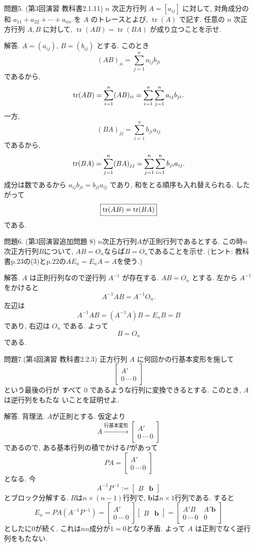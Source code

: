 \documentclass[dvipdfmx,a4paper,11pt]{article} %
\theoremstyle{definition}
\begin{document}
問題5. (第3回演習 教科書2.1.11) \(n\) 次正方行列 \(A=[a_{ij}]\) に対して, 対角成分の和
\(
a_{11}+a_{22}+\cdots+a_{nn}
\)
を \(A\) のトレースとよび, \(\operatorname{tr}(A)\) で記す. 任意の \(n\) 次正方行列 \(A,B\) に対して,
\(
\operatorname{tr}(AB)=\operatorname{tr}(BA)
\)
が成り立つことを示せ.

解答. 
$A=(a_{ij})$, $B=(b_{ij})$ とする. このとき
\[
(AB)_{ii}
=
\sum_{j=1}^{n}a_{ij}b_{ji}
\]
であるから,
\[
\tr(AB)
=
\sum_{i=1}^{n}(AB)_{ii}
=
\sum_{i=1}^{n}\sum_{j=1}^{n}a_{ij}b_{ji}.
\]
一方,
\[
(BA)_{jj}
=
\sum_{i=1}^{n}b_{ji}a_{ij}
\]
であるから,
\[
\tr(BA)
=
\sum_{j=1}^{n}(BA)_{jj}
=
\sum_{j=1}^{n}\sum_{i=1}^{n}b_{ji}a_{ij}.
\]
成分は数であるから $a_{ij}b_{ji}=b_{ji}a_{ij}$ であり, 和をとる順序も入れ替えられる. したがって
\[
\boxed{\tr(AB)=\tr(BA)}
\]
である.

問題6. (第3回演習追加問題 8) $n$次正方行列$A$が正則行列であるとする.
この時$n$次正方行列$B$について, 
$AB=O_{n}$ならば$B=O_n$であることを示せ.
(ヒント: 教科書p.23の(3)とp.22の$AE_n=E_nA=A$を使う.)

解答. 
$A$ は正則行列なので逆行列 $A^{-1}$ が存在する. $AB=O_n$ とする. 左から $A^{-1}$ をかけると
\[
A^{-1}AB=A^{-1}O_n.
\]
左辺は
\[
A^{-1}AB
=
(A^{-1}A)B
=
E_nB
=
B
\]
であり, 右辺は $O_n$ である. よって
\[
\boxed{B=O_n}
\]
である.

問題7.(第4回演習 教科書2.2.3) 正方行列 \(A\) に何回かの行基本変形を施して
\[
\begin{bmatrix}
A'\\
0 \ \cdots \ 0
\end{bmatrix}
\]
という最後の行が
すべて \(0\) であるような行列に変換できるとする. このとき, \(A\) は逆行列をもたな
いことを証明せよ.

解答. 背理法. $A$が正則とする. 
仮定より
$$
A \overset{\text{行基本変形}}{\longrightarrow} 
\begin{bmatrix}
A'\\
0 \ \cdots \ 0
\end{bmatrix}
$$
であるので, 
ある基本行列の積でかける$P$があって
$$
PA=
\begin{bmatrix}
A'\\
0 \ \cdots \ 0
\end{bmatrix}
$$
となる. 
今
$$
A^{-1}P^{-1}
:=
\begin{bmatrix}
B & \mathbf{b}
\end{bmatrix}
$$
とブロック分解する. $B$は$n \times (n-1)$行列で, 
$\mathbf{b}$は$n \times 1$行列である.
すると
$$
E_n
=
PA (A^{-1}P^{-1})
=
\begin{bmatrix}
A'\\
0 \ \cdots \ 0
\end{bmatrix}
\begin{bmatrix}
B & \mathbf{b}
\end{bmatrix}
=
\begin{bmatrix}
A'B &A'\mathbf{b}\\
0 \ \cdots \ 0 & 0
\end{bmatrix}
$$
としたに0が続く. 
これは$nn$成分が$1=0$となり矛盾. 
よって $A$ は正則でなく逆行列をもたない.
\end{document}
